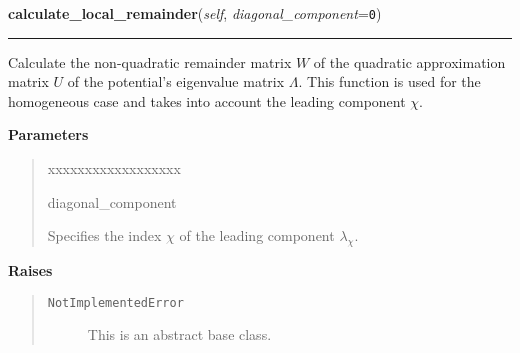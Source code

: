     \vspace{0.5ex}

\hspace{.8\funcindent}\begin{boxedminipage}{\funcwidth}

    \raggedright \textbf{calculate\_local\_remainder}(\textit{self}, \textit{diagonal\_component}={\tt 0})

    \vspace{-1.5ex}

    \rule{\textwidth}{0.5\fboxrule}
\setlength{\parskip}{2ex}
    Calculate the non-quadratic remainder matrix $W$ of the quadratic
    approximation matrix $U$ of the potential's eigenvalue matrix
    $\Lambda$. This function is used for the homogeneous
    case and takes into account the leading component
    $\chi$.

\setlength{\parskip}{1ex}
      \textbf{Parameters}
      \vspace{-1ex}

      \begin{quote}
        \begin{Ventry}{xxxxxxxxxxxxxxxxxx}

          \item[diagonal\_component]

          Specifies the index $\chi$ of the leading
          component $\lambda_\chi$.

        \end{Ventry}

      \end{quote}

      \textbf{Raises}
    \vspace{-1ex}

      \begin{quote}
        \begin{description}

          \item[\texttt{NotImplementedError}]

          This is an abstract base class.

        \end{description}

      \end{quote}

    \end{boxedminipage}

    \label{MatrixPotential:MatrixPotential:evaluate_local_remainder_at}


